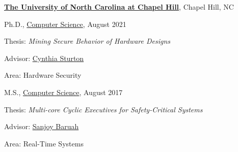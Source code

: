 \documentclass[10pt]{article}
\newcommand\mytab{\tab \hspace{-1.75cm}}
\newcommand{\halfblankline}{\quad\vspace{-0.5\baselineskip}\pagebreak[3]}
\begin{document}
\href{https://www.unc.edu/}{\textbf{The University of North Carolina at Chapel Hill}},
Chapel Hill, NC
\begin{outerlist}

\item[] Ph.D.,
        \href{https://cs.unc.edu/}
             {Computer Science},
             August 2021
        \begin{innerlist}
        \item Thesis:\mytab\hspace{-3cm} \emph{Mining Secure Behavior of Hardware Designs}
        \item Advisor:\mytab\hspace{-3cm}
              \href{https://www.cs.unc.edu/~csturton/}
                   {Cynthia Sturton}
        \item Area:\mytab\hspace{-3cm} Hardware Security
        \end{innerlist}

\item[] M.S.,
        \href{https://cs.unc.edu/}
             {Computer Science},
             August 2017
        \begin{innerlist}
        \item Thesis:\mytab\hspace{-3cm} \emph{Multi-core Cyclic Executives
for Safety-Critical Systems}
        \item Advisor:\mytab\hspace{-3cm}
              \href{https://sites.wustl.edu/baruah/}
                   {Sanjoy Baruah}
        \item Area:\mytab\hspace{-3cm} Real-Time Systems
        \end{innerlist}


\halfblankline

\end{outerlist}
\end{document}
